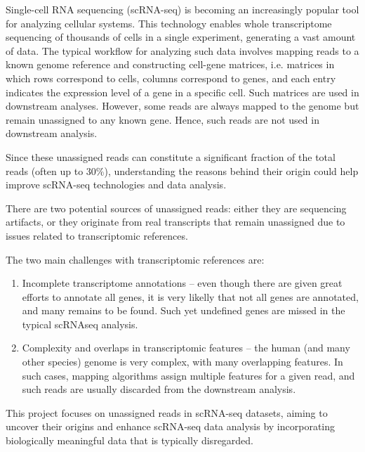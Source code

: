 Single-cell RNA sequencing (scRNA-seq) is becoming an increasingly popular tool for analyzing cellular systems.
This technology enables whole transcriptome sequencing of thousands of cells in a single experiment, generating a vast amount of data.
The typical workflow for analyzing such data involves mapping reads to a known genome reference and constructing cell-gene matrices,
i.e. matrices in which rows correspond to cells, columns correspond to genes,
and each entry indicates the expression level of a gene in a specific cell.
Such matrices are used in downstream analyses.
However, some reads are always mapped to the genome but remain unassigned to any known gene.
Hence, such reads are not used in downstream analysis.

Since these unassigned reads can constitute a significant fraction of the total reads (often up to 30\%),
understanding the reasons behind their origin could help improve scRNA-seq technologies and data analysis.

There are two potential sources of unassigned reads: either they are sequencing artifacts,
or they originate from real transcripts that remain unassigned due to issues related to transcriptomic references.

The two main challenges with transcriptomic references are:

\begin{enumerate}
  \item Incomplete transcriptome annotations –
  even though there are given great efforts to annotate all genes, it is very likelly that not all genes are annotated,
  and many remains to be found.
  Such yet undefined genes are missed in the typical scRNAseq analysis.
  \item Complexity and overlaps in transcriptomic features – the human (and many other species) genome is very complex,
   with many overlapping features.
   In such cases, mapping algorithms assign multiple features for a given read, and such reads are usually discarded from the downstream analysis.
\end{enumerate}

This project focuses on unassigned reads in scRNA-seq datasets, aiming to uncover their origins and 
enhance scRNA-seq data analysis by incorporating biologically meaningful data that is typically disregarded.
